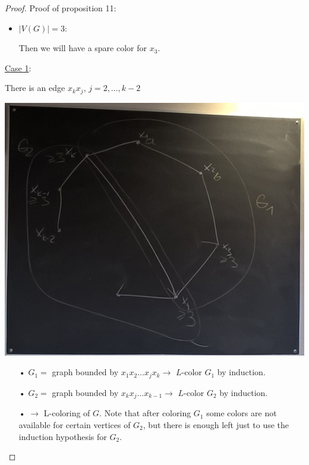 \documentclass[a4paper]{article}
\theoremstyle{plain}
\theoremstyle{myremark}
\begin{document}
\begin{proof}
Proof of proposition 11:

\begin{itemize}
\item $|V(G)|=3$: 
\begin{center}
\end{center}
Then we will have a spare color for $x_3$.
\end{itemize}

\underline{Case 1}:

There is an edge $x_k x_j$, $j=2,\ldots,k-2$
\begin{center}
\includegraphics[scale=0.25]{Case1}
\end{center}
\begin{itemize}
\item[•]$G_1=$ graph bounded by $x_1x_2\ldots x_jx_k \rightarrow$ $L$-color $G_1$ by induction.
\item[•] $G_2=$ graph bounded by $x_kx_j\ldots x_{k-1} \rightarrow $ $L$-color $G_2$ by induction.
\item[•] $\rightarrow$ L-coloring of $G$. Note that after coloring $G_1$ some colors are not available for certain vertices of $G_2$, but there is enough left just to use the induction hypothesis for $G_2$.
\end{itemize}


\end{proof}
\end{document}
